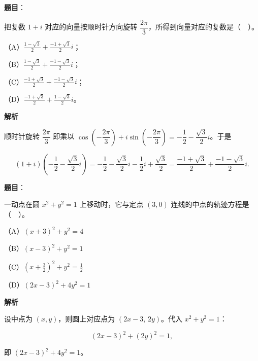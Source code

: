 \begin{answer}

\textbf{题目}：

把复数 $1+i$ 对应的向量按顺时针方向旋转 $\dfrac{2\pi}{3}$，所得到向量对应的复数是（　）。

（A）$\frac{1-\sqrt3}{2}+\frac{-1+\sqrt3}{2}i$；

（B）$\frac{1-\sqrt3}{2}+\frac{-1-\sqrt3}{2}i$；

（C）$\frac{-1+\sqrt3}{2}+\frac{-1-\sqrt3}{2}i$；

（D）$\frac{-1+\sqrt3}{2}+\frac{1-\sqrt3}{2}i$。

\textbf{解析}

顺时针旋转 $\dfrac{2\pi}{3}$ 即乘以 $\cos\left(-\dfrac{2\pi}{3}\right)+i\sin\left(-\dfrac{2\pi}{3}\right)=-\dfrac12-\dfrac{\sqrt3}{2}i$。于是

\nopagebreak[4]
\[
(1+i)\left(-\frac12-\frac{\sqrt3}{2}i\right)
=-\frac12-\frac{\sqrt3}{2}i-\frac12 i+\frac{\sqrt3}{2}
=\frac{-1+\sqrt3}{2}+\frac{-1-\sqrt3}{2}i.
\]


\end{answer}
\begin{answer}

\textbf{题目}：

一动点在圆 $x^2+y^2=1$ 上移动时，它与定点 $(3,0)$ 连线的中点的轨迹方程是（　）。

（A）$(x+3)^2+y^2=4$

（B）$(x-3)^2+y^2=1$

（C）$\left(x+\frac32\right)^2+y^2=\frac12$

（D）$(2x-3)^2+4y^2=1$

\textbf{解析}

设中点为 $(x,y)$，则圆上对应点为 $(2x-3,\,2y)$。代入 $x^2+y^2=1$：

\nopagebreak[4]
\[
(2x-3)^2+(2y)^2=1,
\]

即 $(2x-3)^2+4y^2=1$。


\end{answer}
